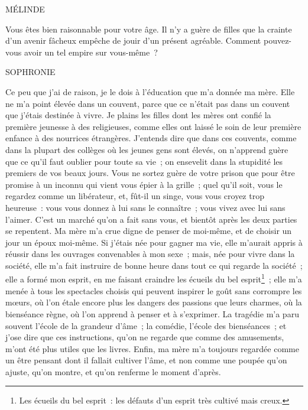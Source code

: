 {\medskip

MÉLINDE

Vous êtes bien raisonnable pour votre âge. Il n'y a guère de filles que la crainte d'un avenir fâcheux empêche de jouir d'un présent agréable. Comment pouvez-vous avoir un tel empire sur vous-même~?

\medskip

SOPHRONIE

Ce peu que j'ai de raison, je le dois à l'éducation que m'a donnée ma mère. Elle ne m'a point élevée dans un couvent, parce que ce n'était pas dans un couvent que j'étais destinée à vivre. Je plains les filles dont les mères ont confié la première jeunesse à des religieuses, comme elles ont laissé le soin de leur première enfance à des nourrices étrangères. J'entends dire que dans ces couvents, comme dans la plupart des collèges où les jeunes gens sont élevés, on n'apprend guère que ce qu'il faut oublier pour toute sa vie~; on ensevelit dans la stupidité les premiers de vos beaux jours. Vous ne sortez guère de votre prison que pour être promise à un inconnu qui vient vous épier à la grille~; quel qu'il soit, vous le regardez comme un libérateur, et, fût-il un singe, vous vous croyez trop heureuse~: vous vous donnez à lui sans le connaître~; vous vivez avec lui sans l'aimer. C'est un marché qu'on a fait sans vous, et bientôt après les deux parties se repentent. Ma mère m'a crue digne de penser de moi-même, et de choisir un jour un époux moi-même. Si j'étais née pour gagner ma vie, elle m'aurait appris à réussir dans les ouvrages convenables à mon sexe~; mais, née pour vivre dans la société, elle m'a fait instruire de bonne heure dans tout ce qui regarde la société~; elle a formé mon esprit, en me faisant craindre les écueils du bel esprit\footnote{Les écueils du bel esprit~: les défauts d'un esprit très cultivé mais creux.}~; elle m'a menée à tous les spectacles choisis qui peuvent inspirer le goût sans corrompre les mœurs, où l'on étale encore plus les dangers des passions que leurs charmes, où la bienséance règne, où l'on apprend à penser et à s'exprimer. La tragédie m'a paru souvent l'école de la grandeur d'âme~; la comédie, l'école des bienséances~; et j'ose dire que ces instructions, qu'on ne regarde que comme des amusements, m'ont été plus utiles que les livres. Enfin, ma mère m'a toujours regardée comme un être pensant dont il fallait cultiver l'âme, et non comme une poupée qu'on ajuste, qu'on montre, et qu'on renferme le moment d'après.
}

